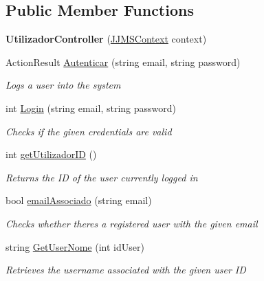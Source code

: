 \subsection*{Public Member Functions}
\begin{DoxyCompactItemize}
\item 
\mbox{\label{classmvc_j_j_m_s_1_1_controllers_1_1_utilizador_controller_a1d833224478b16de3a404928df7c6fb0}} 
{\bfseries Utilizador\+Controller} (\mbox{\hyperlink{classmvc_j_j_m_s_1_1_data_1_1_j_j_m_s_context}{J\+J\+M\+S\+Context}} context)
\item 
Action\+Result \mbox{\hyperlink{classmvc_j_j_m_s_1_1_controllers_1_1_utilizador_controller_af5e72a30b41eb17d41cf14d3f0afd177}{Autenticar}} (string email, string password)
\begin{DoxyCompactList}\small\item\em Logs a user into the system \end{DoxyCompactList}\item 
int \mbox{\hyperlink{classmvc_j_j_m_s_1_1_controllers_1_1_utilizador_controller_ad0adbf91e0872321efd757daea0b6759}{Login}} (string email, string password)
\begin{DoxyCompactList}\small\item\em Checks if the given credentials are valid \end{DoxyCompactList}\item 
int \mbox{\hyperlink{classmvc_j_j_m_s_1_1_controllers_1_1_utilizador_controller_a8243cd298846e34fb97c3c7d2d691174}{get\+Utilizador\+ID}} ()
\begin{DoxyCompactList}\small\item\em Returns the ID of the user currently logged in \end{DoxyCompactList}\item 
bool \mbox{\hyperlink{classmvc_j_j_m_s_1_1_controllers_1_1_utilizador_controller_abc0b8e9e7e35ee0c6f910a4fc63bb6d2}{email\+Associado}} (string email)
\begin{DoxyCompactList}\small\item\em Checks whether there\textquotesingle{}s a registered user with the given email \end{DoxyCompactList}\item 
string \mbox{\hyperlink{classmvc_j_j_m_s_1_1_controllers_1_1_utilizador_controller_a6250c090d89e8a6cea8347d9186daeb0}{Get\+User\+Nome}} (int id\+User)
\begin{DoxyCompactList}\small\item\em Retrieves the username associated with the given user ID \end{DoxyCompactList}\item 

\end{DoxyCompactItemize}
